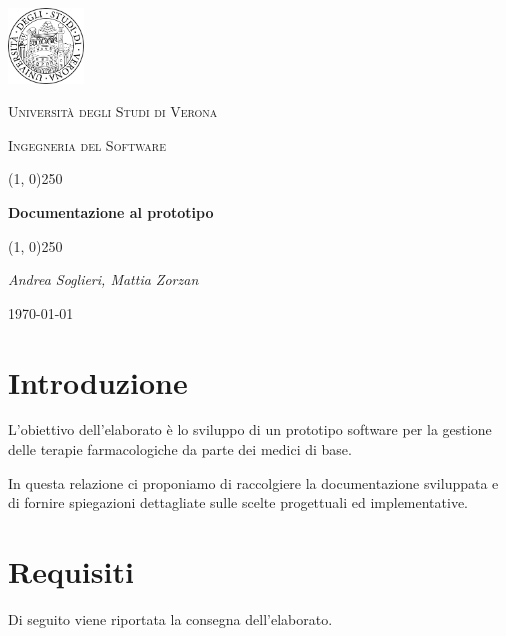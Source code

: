 \documentclass[a4paper]{article}
\begin{document}
	\clearpage
	
	\begin{titlepage}
		\centering
		\vspace*{\fill}
		
		\includegraphics[width=0.15\textwidth]{logo.png}\par\vspace{1cm}
		{\scshape\LARGE Università degli Studi di Verona \par}
		\vspace{1cm}
		
		{\scshape\Large Ingegneria del Software \par}
		\vspace{1.5cm}
		\line(1, 0){250}
		
		{\Large\bfseries Documentazione al prototipo \par}
		\line(1, 0){250}
		
		{\Large\itshape Andrea Soglieri, Mattia Zorzan \par}
		\vspace{5cm}
		\vspace*{\fill}
		
		{\Large \today\par}
	\end{titlepage}
	\thispagestyle{empty}
	\newpage
	\tableofcontents
	\newpage
	
	\section{Introduzione}
		L'obiettivo dell'elaborato è lo sviluppo di un prototipo software per la gestione delle terapie farmacologiche da parte dei medici di base.
		
		In questa relazione ci proponiamo di raccolgiere la documentazione sviluppata e di fornire spiegazioni dettagliate sulle scelte progettuali ed implementative.
	\section{Requisiti}
		Di seguito viene riportata la consegna dell'elaborato.
		
\end{document}
